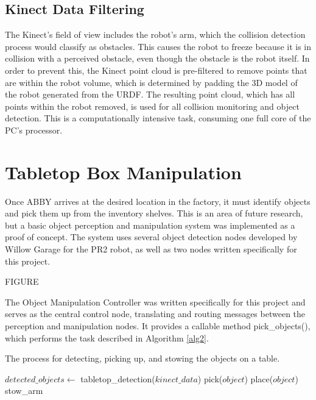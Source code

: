 \documentclass[]{cwru} %
\begin{document}
\subsection{Kinect Data Filtering}

The Kinect's field of view includes the robot's arm, which the collision
detection process would classify as obstacles. This causes the robot to
freeze because it is in collision with a perceived obstacle, even though
the obstacle is the robot itself. In order to prevent this, the Kinect
point cloud is pre-filtered to remove points that are within the robot
volume, which is determined by padding the 3D model of the robot
generated from the URDF. The resulting point cloud, which has all points
within the robot removed, is used for all collision monitoring and
object detection. This is a computationally intensive task, consuming
one full core of the PC's processor.

\section{Tabletop Box Manipulation}
\label{tabletop-manip}

Once ABBY arrives at the desired location in the factory, it must
identify objects and pick them up from the inventory shelves. This is an
area of future research, but a basic object perception and manipulation
system was implemented as a proof of concept. The system uses several
object detection nodes developed by Willow Garage for the PR2 robot, as
well as two nodes written specifically for this project.

FIGURE

The Object Manipulation Controller was written specifically for this
project and serves as the central control node, translating and routing
messages between the perception and manipulation nodes. It provides a
callable method pick\_objects(), which performs the task described in
Algorithm \ref{alg2}.

\begin{algorithm}
\caption{The process for detecting, picking up, and stowing the objects
on a table.}
\label{alg2}
\begin{algorithmic}

\STATE $detected\_objects \gets$ tabletop\_detection($kinect\_data$)
    \STATE pick($object$)
    \STATE place($object$)
    \STATE stow\_arm
  \ENDIF
\ENDFOR
\end{algorithmic}
\end{algorithm}
\end{document}
